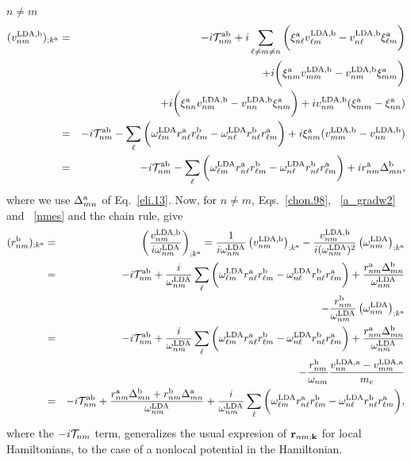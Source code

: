  $n\ne m$
\begin{eqnarray}\label{nmes}
(v^{\mathrm{LDA},\mathrm{b}}_{nm})_{;k^{\mathrm{a}}}&=&
-i{\cal T}^{\mathrm{a}\mathrm{b}}_{nm}
+i
\sum_{\ell\ne m\ne n}
\bigg(
\xi^{\mathrm{a}}_{n\ell}
v^{\mathrm{LDA},\mathrm{b}}_{\ell m}
-
v^{\mathrm{LDA},\mathrm{b}}_{n\ell}
\xi^{\mathrm{a}}_{\ell m}
\bigg)
\nonumber\\
&&+
i
\bigg(
\xi^{\mathrm{a}}_{nm}
v^{\mathrm{LDA},\mathrm{b}}_{mm}
-
v^{\mathrm{LDA},\mathrm{b}}_{nm}
\xi^{\mathrm{a}}_{mm}
\bigg)
\nonumber\\
&&+
i
\bigg(
\xi^{\mathrm{a}}_{nn}
v^{\mathrm{LDA},\mathrm{b}}_{nm}
-
v^{\mathrm{LDA},\mathrm{b}}_{nn}
\xi^{\mathrm{a}}_{nm}
\bigg)
+i
v^{\mathrm{LDA},\mathrm{b}}_{nm}(\xi^{\mathrm{a}}_{mm}
-
\xi^{\mathrm{a}}_{nn}
)
\nonumber \\
&=&
-i{\cal T}^{\mathrm{a}\mathrm{b}}_{nm}
-
\sum_{\ell}
\bigg(
\omega^{\mathrm{LDA}}_{\ell m}
r^{\mathrm{a}}_{n\ell}
r^{\mathrm{b}}_{\ell m}
-
\omega^{\mathrm{LDA}}_{n\ell}
r^{\mathrm{b}}_{n\ell}
r^{\mathrm{a}}_{\ell m}
\bigg)
+i
\xi^{\mathrm{a}}_{nm}
(v^{\mathrm{LDA},\mathrm{b}}_{mm}
-
v^{\mathrm{LDA},\mathrm{b}}_{nn}
)
\nonumber \\
&=&
-i{\cal T}^{\mathrm{a}\mathrm{b}}_{nm}
-
\sum_{\ell}
\bigg(
\omega^{\mathrm{LDA}}_{\ell m} 
r^{\mathrm{a}}_{n\ell} 
r^{\mathrm{b}}_{\ell m}
-
\omega^{\mathrm{LDA}}_{n\ell} 
r^{\mathrm{b}}_{n\ell} 
r^{\mathrm{a}}_{\ell m}
\bigg)
+i 
r^{\mathrm{a}}_{nm}
\Delta^{\mathrm{b}}_{mn}
,
\end{eqnarray} 
where we use $\Delta^{\mathrm{a}}_{mn}$ of Eq.~\eqref{eli.13}.
Now, for $n \ne m$, Eqs.~\eqref{chon.98},
~\eqref{a_gradw2} and 
~\eqref{nmes} and the chain rule, give
\begin{eqnarray}\label{na_rgendevn}
(r^{\mathrm{b}}_{nm})_{;k^{\mathrm{a}}}
&=&\left(\frac{v^{\mathrm{LDA},\mathrm{b}}_{nm}}{i\omega^{\mathrm{LDA}}_{nm}}\right)_{;k^{\mathrm{a}}}
=
\frac{1}
{i\omega^{\mathrm{LDA}}_{nm}}
\left( 
v^{\mathrm{LDA},\mathrm{b}}_{nm}
\right)_{;k^{\mathrm{a}}}
-
\frac{v^{\mathrm{LDA},\mathrm{b}}_{nm}}
{i(\omega^{\mathrm{LDA}}_{nm})^2}
\left(
\omega^{\mathrm{LDA}}_{nm}
\right)_{;k^{\mathrm{a}}}
\nonumber \\
&=&
-i{\cal T}^{\mathrm{a}\mathrm{b}}_{nm}
+
\frac{i}{\omega^{\mathrm{LDA}}_{nm}}
\sum_{\ell}
\bigg(
\omega^{\mathrm{LDA}}_{\ell m} 
r^{\mathrm{a}}_{n\ell} 
r^{\mathrm{b}}_{\ell m}
-
\omega^{\mathrm{LDA}}_{n\ell} 
r^{\mathrm{b}}_{n\ell} 
r^{\mathrm{a}}_{\ell m}
\bigg)
+
\frac{r^{\mathrm{a}}_{nm}
\Delta^{\mathrm{b}}_{mn}}
{\omega^{\mathrm{LDA}}_{nm}}
\nonumber \\
&&
-
\frac{r^{\mathrm{b}}_{nm}}
{\omega^{\mathrm{LDA}}_{nm}}
\left(
\omega^{\mathrm{LDA}}_{nm}
\right)_{;k^{\mathrm{a}}}
\nonumber \\
&=&
-i{\cal T}^{\mathrm{a}\mathrm{b}}_{nm}
+
\frac{i}{\omega^{\mathrm{LDA}}_{nm}}
\sum_{\ell}
\bigg(
\omega^{\mathrm{LDA}}_{\ell m} 
r^{\mathrm{a}}_{n\ell} 
r^{\mathrm{b}}_{\ell m}
-
\omega^{\mathrm{LDA}}_{n\ell} 
r^{\mathrm{b}}_{n\ell} 
r^{\mathrm{a}}_{\ell m}
\bigg)
+
\frac{r^{\mathrm{a}}_{nm}
\Delta^{\mathrm{b}}_{mn}}
{\omega^{\mathrm{LDA}}_{nm}}
\nonumber \\
&&
-
\frac{r^{\mathrm{b}}_{nm}}
{\omega_{nm}}
\frac{v^{\mathrm{LDA},\mathrm{a}}_{nn}-v^{\mathrm{LDA},\mathrm{a}}_{mm}}{m_e}
\nonumber \\
&=&
-i{\cal T}^{\mathrm{a}\mathrm{b}}_{nm}
+
\frac{ 
r^{\mathrm{a}}_{nm}
\Delta^{\mathrm{b}}_{mn}
+r^{\mathrm{b}}_{nm}
\Delta^{\mathrm{a}}_{mn}
}
{\omega^{\mathrm{LDA}}_{nm}}
+
\frac{i}{\omega^{\mathrm{LDA}}_{nm}}
\sum_{\ell}
\bigg(
\omega^{\mathrm{LDA}}_{\ell m} 
r^{\mathrm{a}}_{n\ell} 
r^{\mathrm{b}}_{\ell m}
-
\omega^{\mathrm{LDA}}_{n\ell} 
r^{\mathrm{b}}_{n\ell} 
r^{\mathrm{a}}_{\ell m}
\bigg)
,
\end{eqnarray} 
where the $-i{\cal T}_{nm}$ term, generalizes the usual expresion of
$\mathbf{r}_{nm;\mathbf{k}}$ for local 
Hamiltonians,\cite{aversaPRB95,nastosPRB05,cabellosPRB09,rashkeevPRB98}
to
the case of a
nonlocal potential in the Hamiltonian.
